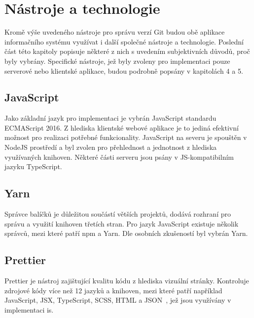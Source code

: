 

\section{Nástroje a technologie}

Kromě výše uvedeného nástroje pro správu verzí Git budou obě aplikace informačního systému využívat i další společné nástroje a technologie. Poslední část této kapitoly popisuje některé z nich s uvedením subjektivních důvodů, proč byly vybrány. Specifické nástroje, jež byly zvoleny pro implementaci pouze serverové nebo klientské aplikace, budou podrobně popsány v kapitolách 4 a 5. 

\subsection{JavaScript}
Jako základní jazyk pro implementaci je vybrán JavaScript standardu ECMAScript 2016. Z hlediska klientské webové aplikace je to jediná efektivní možnost pro realizaci potřebné funkcionality. JavaScript na severu je spouštěn v NodeJS prostředí a byl zvolen pro přehlednost a jednotnost z hlediska využívaných knihoven. Některé části serveru jsou psány v JS-kompatibilním jazyku TypeScript.

\subsection{Yarn}
Správce balíčků je důležitou součástí větších projektů, dodává rozhraní pro správu a využití knihoven třetích stran. Pro jazyk JavaScript existuje několik správců, mezi které patří npm a Yarn. Dle osobních zkušeností byl vybrán Yarn.

\subsection{Prettier}
Prettier je nástroj zajištující kvalitu kódu z hlediska vizuální stránky. Kontroluje zdrojové kódy více než 12 jazyků a knihoven, mezi které patří například JavaScript, JSX, TypeScript, SCSS, HTML a JSON~\cite{prettier}, jež jsou využívány v implementaci \gls{is}.